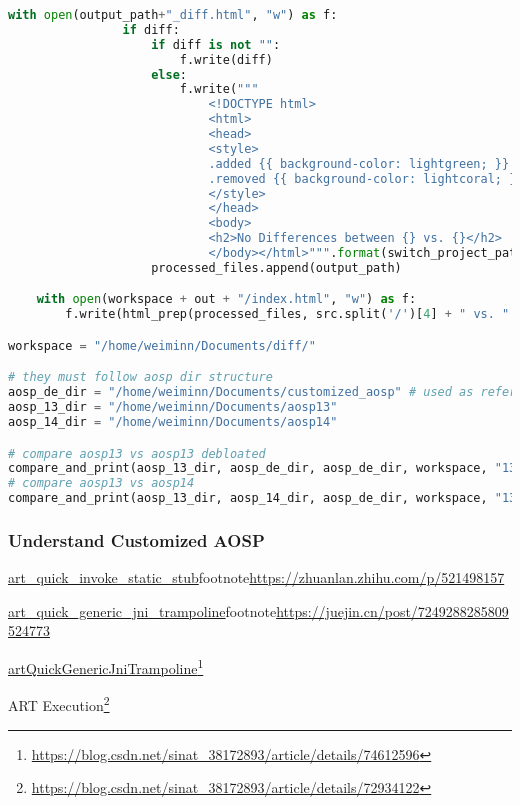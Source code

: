 \begin{lstlisting}[language=python]
            with open(output_path+"_diff.html", "w") as f:
                if diff:
                    if diff is not "":
                        f.write(diff)
                    else:
                        f.write("""
                            <!DOCTYPE html>
                            <html>
                            <head>
                            <style>
                            .added {{ background-color: lightgreen; }}
                            .removed {{ background-color: lightcoral; }}
                            </style>
                            </head>
                            <body>
                            <h2>No Differences between {} vs. {}</h2>
                            </body></html>""".format(switch_project_path(f, src.split('/')[4]), switch_project_path(f, tgt.split('/')[4])))
                    processed_files.append(output_path)

    with open(workspace + out + "/index.html", "w") as f:
        f.write(html_prep(processed_files, src.split('/')[4] + " vs. " + tgt.split('/')[4] + " Differenced", workspace, out))

workspace = "/home/weiminn/Documents/diff/"

# they must follow aosp dir structure
aosp_de_dir = "/home/weiminn/Documents/customized_aosp" # used as reference on what to compare
aosp_13_dir = "/home/weiminn/Documents/aosp13"
aosp_14_dir = "/home/weiminn/Documents/aosp14"

# compare aosp13 vs aosp13 debloated
compare_and_print(aosp_13_dir, aosp_de_dir, aosp_de_dir, workspace, "13vs13debloat")
# compare aosp13 vs aosp14
compare_and_print(aosp_13_dir, aosp_14_dir, aosp_de_dir, workspace, "13vs14")

\end{lstlisting}

\subsubsection{Understand Customized AOSP}

\url{art_quick_invoke_static_stub}footnote{\url{https://zhuanlan.zhihu.com/p/521498157}}

\url{art_quick_generic_jni_trampoline}footnote{\url{https://juejin.cn/post/7249288285809524773}}

\url{artQuickGenericJniTrampoline}\footnote{\url{https://blog.csdn.net/sinat_38172893/article/details/74612596}}

ART Execution\footnote{\url{https://blog.csdn.net/sinat_38172893/article/details/72934122}}

